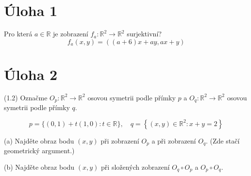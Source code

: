 \documentclass{article}
\begin{document}
\section{Úloha 1}
Pro která $a \in \mathbb{R}$ je zobrazení $f_a: \mathbb{R}^2 \rightarrow \mathbb{R}^2$ surjektivní? 
$$
f_a(x, y)=((a+6) x+a y, a x+y)
$$
\section{Úloha 2}
(1.2) Označme $O_p: \mathbb{R}^2 \rightarrow \mathbb{R}^2$ osovou symetrii podle přímky $p$ a $O_q: \mathbb{R}^2 \rightarrow \mathbb{R}^2$ osovou symetrii podle přímky $q$.

$$
p=\{(0,1)+t(1,0): t \in \mathbb{R}\}, \quad q=\left\{(x, y) \in \mathbb{R}^2: x+y=2\right\}
$$

(a) Najděte obraz bodu $(x, y)$ při zobrazení $O_p$ a při zobrazení $O_q$. (Zde stačí geometrický argument.) 


(b) Najděte obraz bodu $(x, y)$ při složených zobrazení $O_q \circ O_p$ a $O_p \circ O_q$.
\end{document}
